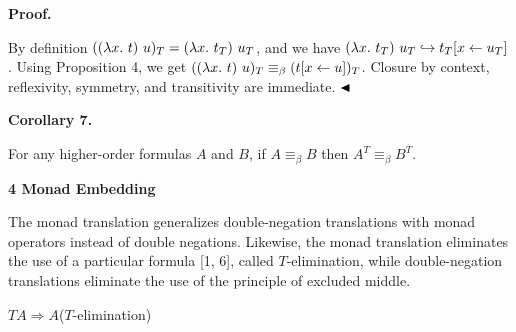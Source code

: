 \documentclass[10pt,a4paper]{article}
\begin{document}
 
 
 
 
\par\medskip\noindent\textbf{Proof.}\par
 
 
By definition $((\lambda x.\leavevmode\nobreak\ t)\leavevmode\nobreak\ u)_{T}=(\lambda x.\leavevmode\nobreak\ t_{T})\leavevmode\nobreak\ u_{T}$, and we have $(\lambda x.\leavevmode\nobreak\ t_{T})\leavevmode\nobreak\ u_{T}\hookrightarrow t_{T}[x\leftarrow u_{T}]$. Using Proposition 4, we get $((\lambda x.\leavevmode\nobreak\ t)\leavevmode\nobreak\ u)_{T}\equiv_{\beta}(t[x\leftarrow u])_{T}$. Closure by context, reflexivity, symmetry, and transitivity are immediate. $\hfill\blacktriangleleft$\par
 
 
 
\par\medskip\noindent\textbf{Corollary 7.}\par
 
 
For any higher-order formulas $A$ and $B$, if $A\equiv_{\beta}B$ then $A^{T}\equiv_{\beta}B^{T}$.\par
 
 
 
 


 
\par\medskip\noindent\textbf{4 Monad Embedding}\par
 
 
The monad translation generalizes double-negation translations with monad operators instead of double negations. Likewise, the monad translation eliminates the use of a particular formula [1, 6], called $T$-elimination, while double-negation translations eliminate the use of the principle of excluded middle.\par
  
\par  \quad  $\displaystyle TA\mathbin{\Rightarrow}A$\quad  \quad  ($T$-elimination)\quad  
  
\end{document}
